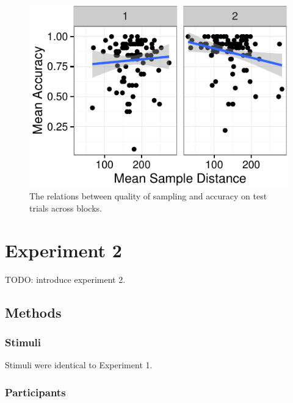 \documentclass[10pt, letterpaper]{article}
\newenvironment{CodeChunk}{}{}
\begin{document}
\begin{CodeChunk}
\captionsetup{width=0.8\columnwidth}\begin{figure}[h]

{\centering \includegraphics{figs/exp1_sampling-acc-plot-1} 

}

\caption[The relations between quality of sampling and accuracy on test trials across blocks]{The relations between quality of sampling and accuracy on test trials across blocks.}\label{fig:exp1_sampling-acc-plot}
\end{figure}
\end{CodeChunk}

\section{Experiment 2}\label{experiment-2}

TODO: introduce experiment 2.

\subsection{Methods}\label{methods-2}

\subsubsection{Stimuli}\label{stimuli-2}

Stimuli were identical to Experiment 1.

\subsubsection{Participants}\label{participants-2}
\end{document}
